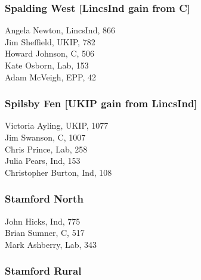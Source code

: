 \documentclass[a4paper,openany,10pt]{book}
\begin{document}
\subsubsection*{Spalding West \hspace*{\fill}\nolinebreak[1]%
\enspace\hspace*{\fill}
[LincsInd gain from C]}



Angela Newton, LincsInd, 866\\
Jim Sheffield, UKIP, 782\\
Howard Johnson, C, 506\\
Kate Osborn, Lab, 153\\
Adam McVeigh, EPP, 42\\


\subsubsection*{Spilsby Fen \hspace*{\fill}\nolinebreak[1]%
\enspace\hspace*{\fill}
[UKIP gain from LincsInd]}



Victoria Ayling, UKIP, 1077\\
Jim Swanson, C, 1007\\
Chris Prince, Lab, 258\\
Julia Pears, Ind, 153\\
Christopher Burton, Ind, 108\\


\subsubsection*{Stamford North}



John Hicks, Ind, 775\\
Brian Sumner, C, 517\\
Mark Ashberry, Lab, 343\\


\subsubsection*{Stamford Rural}

\end{document}
